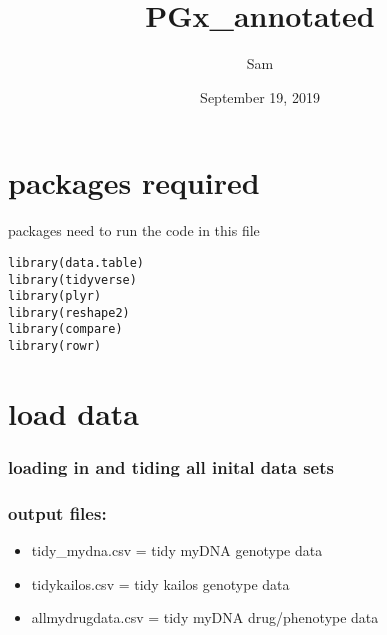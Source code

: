 \documentclass[]{article}
\title{PGx\_annotated}
\author{Sam}
\date{September 19, 2019}
\providecommand{\tightlist}{%
  \setlength{\itemsep}{0pt}\setlength{\parskip}{0pt}}
\begin{document}
\maketitle

\section{packages required}\label{packages-required}

packages need to run the code in this file

\begin{verbatim}
library(data.table)
library(tidyverse)
library(plyr)
library(reshape2)
library(compare)
library(rowr)
\end{verbatim}

\section{load data}\label{load-data}

\subsubsection{loading in and tiding all inital data
sets}\label{loading-in-and-tiding-all-inital-data-sets}

\subsubsection{output files:}\label{output-files}

\begin{itemize}
\tightlist
\item
  tidy\_mydna.csv = tidy myDNA genotype data
\item
  tidykailos.csv = tidy kailos genotype data
\item
  allmydrugdata.csv = tidy myDNA drug/phenotype data
\end{itemize}
\end{document}
